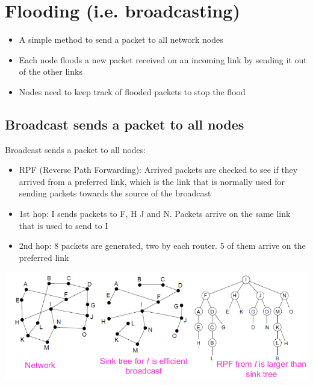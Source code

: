 \documentclass{article}[18pt]
\begin{document}
\section{Flooding (i.e. broadcasting)}
\begin{itemize}
	\item A simple method to send a packet to all network nodes
	\item Each node floods a new packet received on an incoming link by sending it out of the other links
	\item Nodes need to keep track of flooded packets to stop the flood
\end{itemize}
\subsection{Broadcast sends a packet to all nodes}
Broadcast sends a packet to all nodes:
\begin{itemize}
	\item RPF (Reverse Path Forwarding): Arrived packets are checked to see if they arrived from a preferred link, which is the link that is normally used for sending packets towards the source of the broadcast
	\item 1st hop: I sends packets to F, H J and N. Packets arrive on the same link that is used to send to I
	\item 2nd hop: 8 packets are generated, two by each router. 5 of them arrive on the preferred link
\end{itemize}
\begin{center}
	\includegraphics[scale=0.7]{Broadcast}
\end{center}
\end{document}
